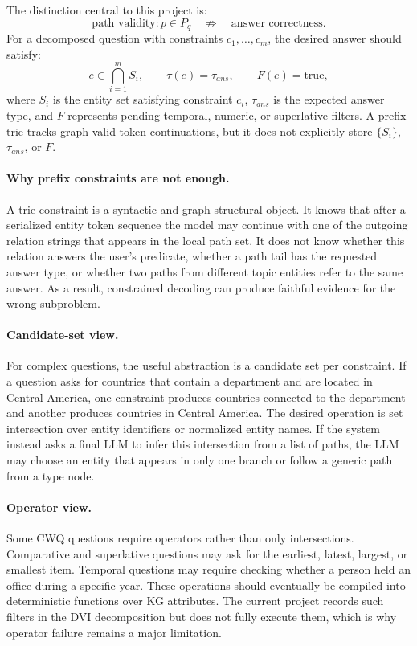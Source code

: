 \documentclass[10pt,twocolumn]{article}
\begin{document}
The distinction central to this project is:
\begin{equation}
\text{path validity}: p \in P_q \quad \not\Rightarrow \quad \text{answer correctness}.
\end{equation}
For a decomposed question with constraints $c_1,\ldots,c_m$, the desired answer should satisfy:
\begin{equation}
e \in \bigcap_{i=1}^{m} S_i, \qquad \tau(e)=\tau_{ans}, \qquad F(e)=\mathrm{true},
\end{equation}
where $S_i$ is the entity set satisfying constraint $c_i$, $\tau_{ans}$ is the expected answer type, and $F$ represents pending temporal, numeric, or superlative filters. A prefix trie tracks graph-valid token continuations, but it does not explicitly store $\{S_i\}$, $\tau_{ans}$, or $F$.


\paragraph{Why prefix constraints are not enough.}
A trie constraint is a syntactic and graph-structural object. It knows that after a serialized entity token sequence the model may continue with one of the outgoing relation strings that appears in the local path set. It does not know whether this relation answers the user's predicate, whether a path tail has the requested answer type, or whether two paths from different topic entities refer to the same answer. As a result, constrained decoding can produce faithful evidence for the wrong subproblem.

\paragraph{Candidate-set view.}
For complex questions, the useful abstraction is a candidate set per constraint. If a question asks for countries that contain a department and are located in Central America, one constraint produces countries connected to the department and another produces countries in Central America. The desired operation is set intersection over entity identifiers or normalized entity names. If the system instead asks a final LLM to infer this intersection from a list of paths, the LLM may choose an entity that appears in only one branch or follow a generic path from a type node.

\paragraph{Operator view.}
Some CWQ questions require operators rather than only intersections. Comparative and superlative questions may ask for the earliest, latest, largest, or smallest item. Temporal questions may require checking whether a person held an office during a specific year. These operations should eventually be compiled into deterministic functions over KG attributes. The current project records such filters in the DVI decomposition but does not fully execute them, which is why operator failure remains a major limitation.
\end{document}
